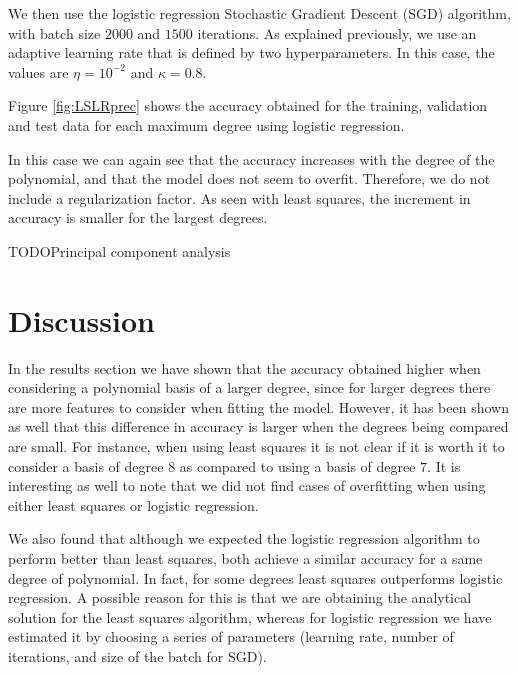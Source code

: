 \documentclass[10pt,conference,compsocconf]{IEEEtran}
\begin{document}
    We then use the logistic regression Stochastic Gradient Descent (SGD) algorithm, with batch size $2000$ and $1500$ iterations. As explained previously, we use an adaptive learning rate that is defined by two hyperparameters. In this case, the values are $\eta = 10^{-2}$ and $\kappa = 0.8$.

    Figure \ref{fig:LSLRprec} shows the accuracy obtained for the training, validation and test data for each maximum degree using logistic regression.


    In this case we can again see that the accuracy increases with the degree of the polynomial, and that the model does not seem to overfit. Therefore, we do not include a regularization factor. As seen with least squares, the increment in accuracy is smaller for the largest degrees.

    TODOPrincipal component analysis

\section{Discussion}
\label{sec:discussion}
  In the results section we have shown that the accuracy obtained higher when considering a polynomial basis of a larger degree, since for larger degrees there are more features to consider when fitting the model. However, it has been shown as well that this difference in accuracy is larger when the degrees being compared are small. For instance, when using least squares it is not clear if it is worth it to consider a basis of degree $8$ as compared to using a basis of degree $7$. It is interesting as well to note that we did not find cases of overfitting when using either least squares or logistic regression.

  We also found that although we expected the logistic regression algorithm to perform better than least squares, both achieve a similar accuracy for a same degree of polynomial. In fact, for some degrees least squares outperforms logistic regression. A possible reason for this is that we are obtaining the analytical solution for the least squares algorithm, whereas for logistic regression we have estimated it by choosing a series of parameters (learning rate, number of iterations, and size of the batch for SGD).
\end{document}
